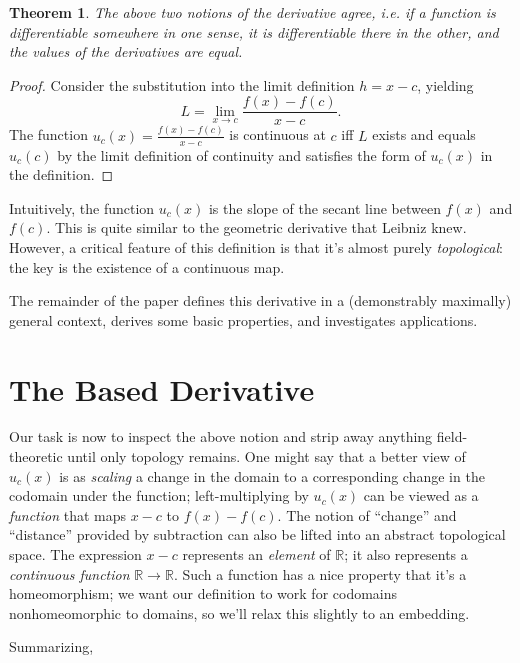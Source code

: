 \documentclass{article}
\newtheorem{thm}{Theorem}
\begin{document}
\begin{thm}
  The above two notions of the derivative agree, i.e. if a function is differentiable somewhere in one sense, it is differentiable there in the other,
  and the values of the derivatives are equal.
\end{thm}

\begin{proof}
  Consider the substitution into the limit definition $h = x - c$, yielding
  \[
    L = \lim_{x \to c}\frac{f(x) - f(c)}{x - c}.
  \]
  The function $u_{c}(x) = \frac{f(x) - f(c)}{x - c}$ is continuous at $c$ iff $L$ exists and equals $u_{c}(c)$ by the limit definition of continuity
  and satisfies the form of $u_{c}(x)$ in the definition.
\end{proof}

Intuitively, the function $u_{c}(x)$ is the slope of the secant line between $f(x)$ and $f(c)$.
This is quite similar to the geometric derivative that Leibniz knew. %
However, a critical feature of this definition is that it's almost purely \textit{topological}: the key is the existence of a continuous map.

The remainder of the paper defines this derivative in a (demonstrably maximally) general context, derives some basic properties,
and investigates applications.

\section{The Based Derivative}
Our task is now to inspect the above notion and strip away anything field-theoretic until only topology remains.
One might say that a better view of $u_{c}(x)$ is as \textit{scaling} a change in the domain to a corresponding change in the codomain under the function;
left-multiplying by $u_{c}(x)$ can be viewed as a \textit{function} that maps $x - c$ to $f(x) - f(c)$.
The notion of ``change'' and ``distance'' provided by subtraction can also be lifted into an abstract topological space.
The expression $x - c$ represents an \textit{element} of $\mathbb{R}$; it also represents a \textit{continuous function} $\mathbb{R} \to \mathbb{R}$.
Such a function has a nice property that it's a homeomorphism; we want our definition to work for codomains nonhomeomorphic to domains,
so we'll relax this slightly to an embedding.


Summarizing,
\end{document}
